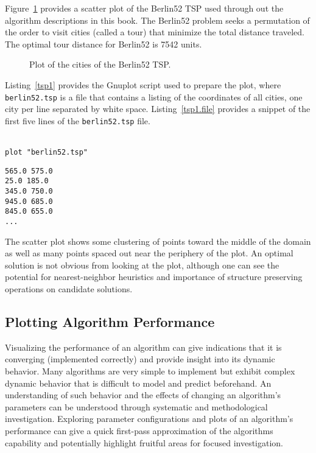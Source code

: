 Figure~\ref{plot:tsp1} provides a scatter plot of the Berlin52 TSP used through out the algorithm descriptions in this book. The Berlin52 problem seeks a permutation of the order to visit cities (called a tour) that minimize the total distance traveled. The optimal tour distance for Berlin52 is 7542 units.

\begin{figure}[htp]
\centering

\caption{Plot of the cities of the Berlin52 TSP.}
\label{plot:tsp1}
\end{figure}

Listing~\ref{tsp1} provides the Gnuplot script used to prepare the plot, where \texttt{berlin52\-.tsp} is a file that contains a listing of the coordinates of all cities, one city per line separated by white space. Listing~\ref{tsp1.file} provides a snippet of the first five lines of the \texttt{berlin52\-.tsp} file.
\\
\\
\begin{lstlisting}[caption=Gnuplot script for plotting the Berlin52 TSP., label=tsp1]
plot "berlin52.tsp"
\end{lstlisting}

\begin{lstlisting}[caption=Snippet of the \texttt{berlin52.tsp} file., label=tsp1.file]
565.0 575.0
25.0 185.0
345.0 750.0
945.0 685.0
845.0 655.0
...
\end{lstlisting}

The scatter plot shows some clustering of points toward the middle of the domain as well as many points spaced out near the periphery of the plot. An optimal solution is not obvious from looking at the plot, although one can see the potential for nearest-neighbor heuristics and importance of structure preserving operations on candidate solutions.

%
%
\subsection{Plotting Algorithm Performance}
Visualizing the performance of an algorithm can give indications that it is converging (implemented correctly) and provide insight into its dynamic behavior. Many algorithms are very simple to implement but exhibit complex dynamic behavior that is difficult to model and predict beforehand. An understanding of such behavior and the effects of changing an algorithm's parameters can be understood through systematic and methodological investigation. Exploring parameter configurations and plots of an algorithm's performance can give a quick first-pass approximation of the algorithms capability and potentially highlight fruitful areas for focused investigation.

